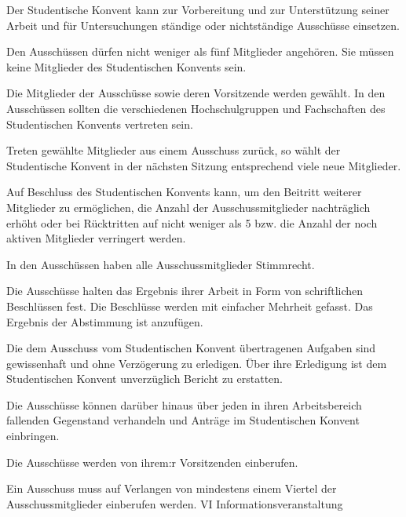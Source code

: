 \documentclass[10pt,a4paper]{scrartcl}
\begin{document}
\begin{contract}


\label{wahl-der-ausschuxfcsse}

Der Studentische Konvent kann zur Vorbereitung und zur Unterstützung
seiner Arbeit und für Untersuchungen ständige oder nichtständige
Ausschüsse einsetzen.

Den Ausschüssen dürfen nicht weniger als fünf Mitglieder angehören.
Sie müssen keine Mitglieder des Studentischen Konvents sein.

Die Mitglieder der Ausschüsse sowie deren Vorsitzende werden gewählt.
In den Ausschüssen sollten die verschiedenen Hochschulgruppen und
Fachschaften des Studentischen Konvents vertreten sein.

Treten gewählte Mitglieder aus einem Ausschuss zurück, so wählt der
Studentische Konvent in der nächsten Sitzung entsprechend viele neue
Mitglieder.

Auf Beschluss des Studentischen Konvents kann, um den Beitritt
weiterer Mitglieder zu ermöglichen, die Anzahl der Ausschussmitglieder
nachträglich erhöht oder bei Rücktritten auf nicht weniger als 
5 bzw. die Anzahl der noch aktiven Mitglieder verringert werden.



\label{stimmrecht}

In den Ausschüssen haben alle Ausschussmitglieder Stimmrecht.


\label{beschlussfassung-der-ausschuxfcsse}

Die Ausschüsse halten das Ergebnis ihrer Arbeit in Form von
schriftlichen Beschlüssen fest. Die Beschlüsse werden mit einfacher
Mehrheit gefasst. Das Ergebnis der Abstimmung ist anzufügen.


\label{aufgaben-und-rechte-der-ausschuxfcsse}

  Die dem Ausschuss vom Studentischen Konvent übertragenen Aufgaben sind
  gewissenhaft und ohne Verzögerung zu erledigen. Über ihre Erledigung
  ist dem Studentischen Konvent unverzüglich Bericht zu erstatten.

  Die Ausschüsse können darüber hinaus über jeden in ihren
  Arbeitsbereich fallenden Gegenstand verhandeln und Anträge im
  Studentischen Konvent einbringen.



\label{sitzungen}

  Die Ausschüsse werden von ihrem:r Vorsitzenden einberufen.

  Ein Ausschuss muss auf Verlangen von mindestens einem Viertel der
  Ausschussmitglieder einberufen werden. VI Informationsveranstaltung

\end{contract}
\end{document}

